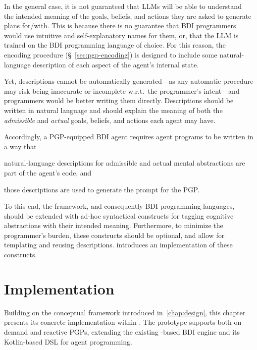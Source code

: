 \documentclass[12pt,a4paper,openright,twoside]{book}
\begin{document}
In the general case, it is not guaranteed that \acp{LLM} will be able to understand the intended meaning of the goals, beliefs, and actions they are asked to generate plans for/with.
%
This is because there is no guarantee that \ac{BDI} programmers would use intuitive and self-explanatory names for them, or, that the \ac{LLM} is trained on the \ac{BDI} programming language of choice.
%
For this reason, the encoding procedure (\S~\ref{sec:pgp-encoding}) is designed to include some natural-language description of each aspect of the agent's internal state.

Yet, descriptions cannot be automatically generated---as any automatic procedure may risk being inaccurate or incomplete w.r.t.\ the programmer's intent---and programmers would be better writing them directly.
%
Descriptions should be written in natural language and should explain the meaning of both the \emph{admissible} and \emph{actual} goals, beliefs, and actions each agent may have.

Accordingly, a \ac{PGP}-equipped \ac{BDI} agent requires agent programs to be written in a way that
\begin{inlinelist}
    \item natural-language descriptions for admissible and actual mental abstractions are part of the agent's code, and
    \item those descriptions are used to generate the prompt for the \ac{PGP}.
\end{inlinelist}
%
To this end, the \agentspeak{} framework, and consequently \ac{BDI} programming languages, should be extended with ad-hoc syntactical constructs for tagging cognitive abstractions with their intended meaning.
%
Furthermore, to minimize the programmer's burden, these constructs should be optional, and allow for templating and reusing descriptions.
%
 introduces an implementation of these constructs.

\chapter{Implementation}\label{chap:implementation}

Building on the conceptual framework introduced in~\cref{chap:design}, this chapter presents its concrete implementation within \jakta{}.
%
The prototype supports both on-demand and reactive \acp{PGP}, extending the existing \agentspeak{}-based \ac{BDI} engine and its Kotlin-based \ac{DSL} for agent programming.
\end{document}
